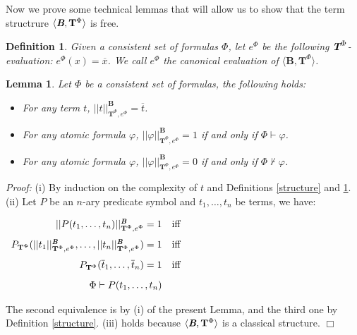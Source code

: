 \documentclass{IOS-Book-Article}
\newtheorem{lemma}{Lemma}
\newtheorem{defi}{Definition}
\newenvironment{proof}{ \noindent \textit{Proof:} }
{\hfill$\Box$\endtrivlist}
\begin{document}
\bigskip

Now we prove some technical lemmas that will allow us to show that the term structrure $\langle\emph{\textbf{B}},\mathrm{\mathbf{T}}^{\Phi}\rangle$ is free.

\begin{defi} \label{canonical}
Given a consistent set of formulas $\Phi$, let $e^{\Phi}$ be the following $\emph{\textbf{T}}^{\Phi}$-evaluation: $e^{\Phi}(x)=\overline{x}$. We call $e^{\Phi}$ the \emph{canonical evaluation of} $\langle\textbf{B},\mathrm{\mathbf{T}}^{\Phi}\rangle$. 
\end{defi}

\begin{lemma} \label{terms and atomic formulas}
 Let $\Phi$ be a consistent set of formulas, the following holds:
 \begin{itemize}
\item[(i)] For any term $t$, $|| t ||^{\textbf{B}}_{\mathrm{\mathbf{T}}^{\Phi},e^{\Phi}}=\overline{t}$.

\item[(ii)] For any atomic formula $\varphi$, $|| \varphi||^{\textbf{B}}_{\mathrm{\mathbf{T}}^{\Phi},e^{\Phi}}=1$ if and only if $\Phi\vdash\varphi$.

\item[(iii)] For any atomic formula $\varphi$, $|| \varphi||^{\textbf{B}}_{\mathrm{\mathbf{T}}^{\Phi},e^{\Phi}}=0$ if and only if $\Phi\not \vdash\varphi$.
\end{itemize}
\end{lemma}

\begin{proof}
(i) By induction on the complexity of $t$ and Definitions \ref{structure} and \ref{canonical}. \newline
(ii) Let $P$ be an $n$-ary predicate symbol and $t_1,\ldots,t_n$ be terms, we have:


\medskip$\begin{array}{rr} ||P(t_1,\ldots,t_n)||^{\emph{\textbf{B}}}_{\mathrm{\mathbf{T}}^{\Phi},e^{\Phi}}=1 & \text{iff} 
\\[2ex]  P_{\mathrm{\mathbf{T}}^{\Phi}}(|| t_1 ||^{\emph{\textbf{B}}}_{\mathrm{\mathbf{T}}^{\Phi},e^{\Phi}},\ldots,|| t_n ||^{\emph{\textbf{B}}}_{\mathrm{\mathbf{T}}^{\Phi},e^{\Phi}})=1 & \text{iff}

\\[2ex]  P_{\mathrm{\mathbf{T}}^{\Phi}}(\overline{t}_1,\ldots,\overline{t}_n)=1 & \text{iff}
\\[2ex] \Phi\vdash P(t_1,\ldots, t_n) & \end{array}$

\medskip \noindent The second equivalence is by (i) of the present Lemma, and the third one by Definition \ref{structure}. (iii) holds because $\langle\emph{\textbf{B}},\mathrm{\mathbf{T}}^{\Phi}\rangle$ is a classical structure. \end{proof}
\end{document}
